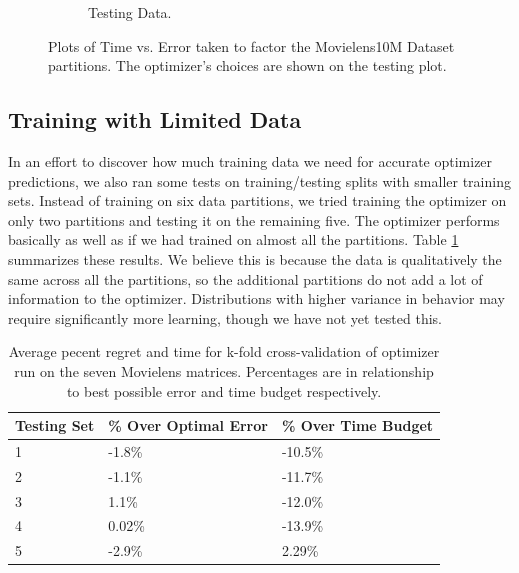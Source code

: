 \begin{figure}
\begin{subfigure}[b]{.45\textwidth}
\begin{center}
		\caption{Testing Data. }
\end{center}
	\end{subfigure}
\hfill
	\caption{Plots of Time vs. Error taken to factor the Movielens10M 
	Dataset partitions. The optimizer's choices are shown on the testing
	plot.}	

\end{figure}

\subsection{Training with Limited Data}
In an effort to discover how much training data we need for accurate 
optimizer predictions, we also ran some tests on training/testing 
splits with smaller training sets. Instead of training on six 
data partitions, we tried training the optimizer on only two partitions 
and testing it on the remaining five. The optimizer performs basically 
as well as if we had trained on almost all the partitions. 
Table \ref{fig:MovieTrain2Table} summarizes these results. We believe 
this is because the data is qualitatively the same across all the 
partitions, so the additional partitions do not add a lot of information 
to the optimizer. Distributions with higher variance in behavior 
may require significantly more learning, though we have not yet 
tested this. 

\begin{table}
\label{fig:MovieTrain2Table}
\begin{center}
    \begin{tabular}{| p{2.2cm} | p{2.2cm} | p{2.2cm} |}
    \hline
    Testing Set & \% Over Optimal Error & \% Over Time Budget \\ \hline
    1 & -1.8\% & -10.5\% \\ \hline
    2 & -1.1\% & -11.7\% \\ \hline
    3 & 1.1\% & -12.0\% \\ \hline
    4 & 0.02\% & -13.9\% \\ \hline
    5 & -2.9\% & 2.29\% \\ \hline
    \end{tabular}
\end{center}
\caption{Average pecent regret and time for k-fold cross-validation of optimizer run on the seven Movielens matrices. Percentages are in relationship to best possible error and time budget respectively.}
\end{table}


